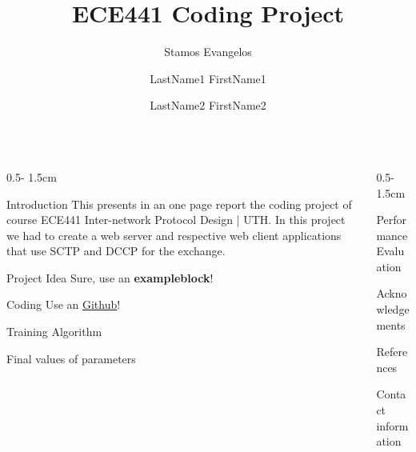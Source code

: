 \documentclass{ntuaposter}
\title{ECE441 Coding Project}
\author
{%
    Stamos Evangelos\inst{}
    \and
    LastName1 FirstName1\inst{}
    \and
    LastName2 FirstName2\inst{}
}
\institute
{
    \inst{} School of Electrical and Computer Engineering
}
\begin{document}
\begin{frame}
\begin{columns}[onlytextwidth]


\begin{column}{0.5\textwidth - 1.5cm}
    \begin{block}{Introduction}
        This  presents in an one page report the coding project of course ECE441 Inter-network Protocol Design | UTH. In this project we had to create a web server and respective web client applications that use SCTP and DCCP for the exchange.
    \end{block}

    \begin{exampleblock}{Project Idea}
        Sure, use an \textbf{exampleblock}!
    \end{exampleblock}

    \begin{alertblock}{Coding}
        Use an \alert{\href{https://github.com/estamos/SCTP-DCCP-Server-Client}{Github}}!
    \end{alertblock}

    \begin{block}{Training Algorithm}
        \lipsum[1]
    \end{block}

    \begin{block}{Final values of parameters}
        \lipsum[teststest]
        \unskip
    \end{block}
\end{column}


\begin{column}{0.5\textwidth - 1.5cm}
    \begin{block}{Performance Evaluation}
        \lipsum[4]
    \end{block}

    \begin{block}{Acknowledgements}
        \lipsum[5]
    \end{block}

    \begin{block}{References}
        \lipsum[6]
    \end{block}

    \begin{block}{Contact information}
        \lipsum[test]
    \end{block}
\end{column}


\end{columns}

\end{frame}
\end{document}
